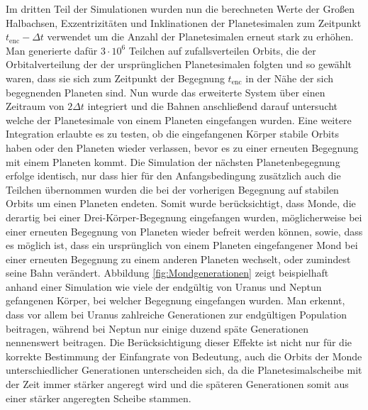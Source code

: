 \documentclass[12pt,a4paper,twoside]{article}
\begin{document}
Im dritten Teil der Simulationen wurden nun die berechneten Werte der Großen Halbachsen, Exzentrizitäten und Inklinationen der Planetesimalen zum Zeitpunkt $t_{\mathrm{enc}}-\Delta t$ verwendet um die Anzahl der Planetesimalen erneut stark zu erhöhen. Man generierte dafür $3 \cdot 10^6$ Teilchen auf zufallsverteilen Orbits, die der Orbitalverteilung der der ursprünglichen Planetesimalen folgten und so gewählt waren, dass sie sich zum Zeitpunkt der Begegnung $t_{\mathrm{enc}}$ in der Nähe der sich begegnenden Planeten sind. %
Nun wurde das erweiterte System über einen Zeitraum von $2 \Delta t$ integriert und die Bahnen anschließend darauf untersucht welche der Planetesimale von einem Planeten eingefangen wurden. %
Eine weitere Integration erlaubte es zu testen, ob die eingefangenen Körper stabile Orbits haben oder den Planeten wieder verlassen, bevor es zu einer erneuten Begegnung mit einem Planeten kommt.
Die Simulation der nächsten Planetenbegegnung erfolge identisch, nur dass hier für den Anfangsbedingung zusätzlich auch die Teilchen übernommen wurden die bei der vorherigen Begegnung auf stabilen Orbits um einen Planeten endeten.
Somit wurde berücksichtigt, dass Monde, die derartig bei einer Drei-Körper-Begegnung eingefangen wurden, möglicherweise bei einer erneuten Begegnung von Planeten wieder befreit werden können, sowie, dass es möglich ist, dass ein ursprünglich von einem Planeten eingefangener Mond bei einer erneuten Begegnung zu einem anderen Planeten wechselt, oder zumindest seine Bahn verändert\cite{Nesvorny2007}. %
Abbildung \ref{fig:Mondgenerationen} zeigt beispielhaft anhand einer Simulation wie viele der endgültig von Uranus und Neptun gefangenen Körper, bei welcher Begegnung eingefangen wurden.
Man erkennt, dass vor allem bei Uranus zahlreiche Generationen zur endgültigen Population beitragen, während bei Neptun nur einige duzend späte Generationen nennenswert beitragen.
Die Berücksichtigung dieser Effekte ist nicht nur für die korrekte Bestimmung der Einfangrate von Bedeutung, auch die Orbits der Monde unterschiedlicher Generationen unterscheiden sich, da die Planetesimalscheibe mit der Zeit immer stärker angeregt wird und die späteren Generationen somit aus einer stärker angeregten Scheibe stammen\cite{Nesvorny2007}.
\end{document}
